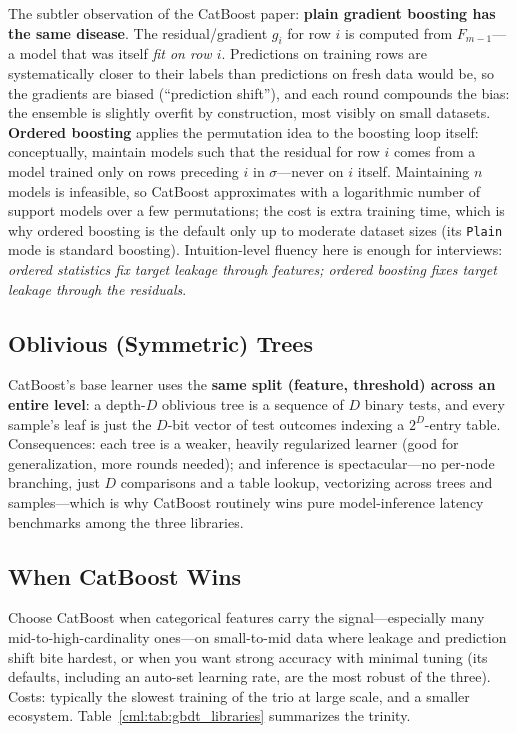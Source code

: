 The subtler observation of the CatBoost paper: \textbf{plain gradient boosting has the same disease}. The residual/gradient $g_i$ for row $i$ is computed from $F_{m-1}$---a model that was itself \textit{fit on row $i$}. Predictions on training rows are systematically closer to their labels than predictions on fresh data would be, so the gradients are biased (``prediction shift''), and each round compounds the bias: the ensemble is slightly overfit by construction, most visibly on small datasets. \textbf{Ordered boosting} applies the permutation idea to the boosting loop itself: conceptually, maintain models such that the residual for row $i$ comes from a model trained only on rows preceding $i$ in $\sigma$---never on $i$ itself. Maintaining $n$ models is infeasible, so CatBoost approximates with a logarithmic number of support models over a few permutations; the cost is extra training time, which is why ordered boosting is the default only up to moderate dataset sizes (its \texttt{Plain} mode is standard boosting). Intuition-level fluency here is enough for interviews: \textit{ordered statistics fix target leakage through features; ordered boosting fixes target leakage through the residuals}.

\subsection{Oblivious (Symmetric) Trees}

CatBoost's base learner uses the \textbf{same split (feature, threshold) across an entire level}: a depth-$D$ oblivious tree is a sequence of $D$ binary tests, and every sample's leaf is just the $D$-bit vector of test outcomes indexing a $2^D$-entry table. Consequences: each tree is a weaker, heavily regularized learner (good for generalization, more rounds needed); and inference is spectacular---no per-node branching, just $D$ comparisons and a table lookup, vectorizing across trees and samples---which is why CatBoost routinely wins pure model-inference latency benchmarks among the three libraries.

\subsection{When CatBoost Wins}

Choose CatBoost when categorical features carry the signal---especially many mid-to-high-cardinality ones---on small-to-mid data where leakage and prediction shift bite hardest, or when you want strong accuracy with minimal tuning (its defaults, including an auto-set learning rate, are the most robust of the three). Costs: typically the slowest training of the trio at large scale, and a smaller ecosystem. Table~\ref{cml:tab:gbdt_libraries} summarizes the trinity.

